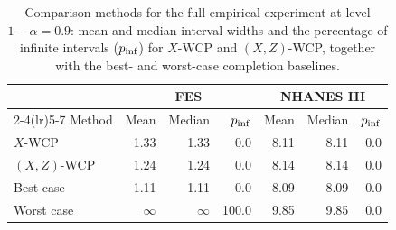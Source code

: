 \begin{table}[!htbp]
\centering\small

\setlength{\tabcolsep}{5pt}
\begin{tabular}{lrrrrrr}
\toprule
& \multicolumn{3}{c}{FES} & \multicolumn{3}{c}{NHANES III} \\
\cmidrule(lr){2-4}\cmidrule(lr){5-7}
Method & Mean & Median & $p_{\rm inf}$ & Mean & Median & $p_{\rm inf}$ \\
\midrule
$X$-WCP & 1.33 & 1.33 & 0.0 & 8.11 & 8.11 & 0.0 \\
$(X,Z)$-WCP & 1.24 & 1.24 & 0.0 & 8.14 & 8.14 & 0.0 \\
Best case & 1.11 & 1.11 & 0.0 & 8.09 & 8.09 & 0.0 \\
Worst case & $\infty$ & $\infty$ & 100.0 & 9.85 & 9.85 & 0.0 \\
\bottomrule
\end{tabular}
\caption{Comparison methods for the full empirical experiment at level $1-\alpha=0.9$: mean and median interval widths and the percentage of infinite intervals ($p_{\rm inf}$) for $X$-WCP and $(X,Z)$-WCP, together with the best- and worst-case completion baselines.}
\label{tab:empirical-application-comparisons}
\end{table}
